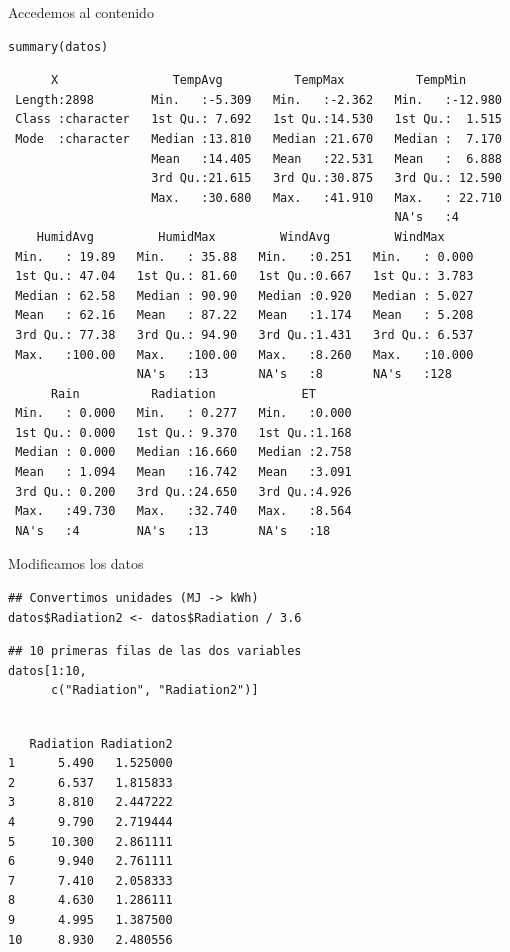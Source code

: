 \documentclass[aspectratio=169, usenames,svgnames,dvipsnames]{beamer}
\begin{document}
\begin{frame}[label={sec:orgdb95d1b},fragile]{Accedemos al contenido}
 \lstset{language=r,label= ,caption= ,captionpos=b,numbers=none}
\begin{lstlisting}
summary(datos)
\end{lstlisting}

\begin{verbatim}
      X                TempAvg          TempMax          TempMin       
 Length:2898        Min.   :-5.309   Min.   :-2.362   Min.   :-12.980  
 Class :character   1st Qu.: 7.692   1st Qu.:14.530   1st Qu.:  1.515  
 Mode  :character   Median :13.810   Median :21.670   Median :  7.170  
                    Mean   :14.405   Mean   :22.531   Mean   :  6.888  
                    3rd Qu.:21.615   3rd Qu.:30.875   3rd Qu.: 12.590  
                    Max.   :30.680   Max.   :41.910   Max.   : 22.710  
                                                      NA's   :4        
    HumidAvg         HumidMax         WindAvg         WindMax      
 Min.   : 19.89   Min.   : 35.88   Min.   :0.251   Min.   : 0.000  
 1st Qu.: 47.04   1st Qu.: 81.60   1st Qu.:0.667   1st Qu.: 3.783  
 Median : 62.58   Median : 90.90   Median :0.920   Median : 5.027  
 Mean   : 62.16   Mean   : 87.22   Mean   :1.174   Mean   : 5.208  
 3rd Qu.: 77.38   3rd Qu.: 94.90   3rd Qu.:1.431   3rd Qu.: 6.537  
 Max.   :100.00   Max.   :100.00   Max.   :8.260   Max.   :10.000  
                  NA's   :13       NA's   :8       NA's   :128     
      Rain          Radiation            ET       
 Min.   : 0.000   Min.   : 0.277   Min.   :0.000  
 1st Qu.: 0.000   1st Qu.: 9.370   1st Qu.:1.168  
 Median : 0.000   Median :16.660   Median :2.758  
 Mean   : 1.094   Mean   :16.742   Mean   :3.091  
 3rd Qu.: 0.200   3rd Qu.:24.650   3rd Qu.:4.926  
 Max.   :49.730   Max.   :32.740   Max.   :8.564  
 NA's   :4        NA's   :13       NA's   :18
\end{verbatim}
\end{frame}

\begin{frame}[label={sec:org3ceb5b8},fragile]{Modificamos los datos}
 \lstset{language=r,label= ,caption= ,captionpos=b,numbers=none}
\begin{lstlisting}
## Convertimos unidades (MJ -> kWh)
datos$Radiation2 <- datos$Radiation / 3.6
\end{lstlisting}

\lstset{language=r,label= ,caption= ,captionpos=b,numbers=none}
\begin{lstlisting}
## 10 primeras filas de las dos variables
datos[1:10,
      c("Radiation", "Radiation2")]
\end{lstlisting}

\begin{verbatim}

   Radiation Radiation2
1      5.490   1.525000
2      6.537   1.815833
3      8.810   2.447222
4      9.790   2.719444
5     10.300   2.861111
6      9.940   2.761111
7      7.410   2.058333
8      4.630   1.286111
9      4.995   1.387500
10     8.930   2.480556
\end{verbatim}
\end{frame}
\end{document}
